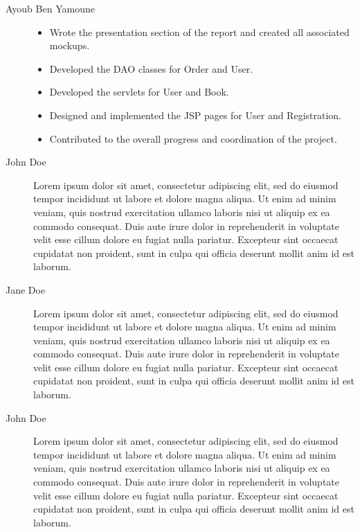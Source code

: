 \begin{description}
	\item[Ayoub Ben Yamoune] 	    
	\begin{itemize}
		\item Wrote the presentation section of the report and created all associated mockups.
		\item Developed the DAO classes for Order and User.
		\item Developed the servlets for User and Book.
		\item Designed and implemented the JSP pages for User and Registration.
		\item Contributed to the overall progress and coordination of the project.
	\end{itemize}


	\item[John Doe] Lorem ipsum dolor sit amet, consectetur adipiscing elit, sed do eiusmod tempor incididunt ut labore et dolore magna aliqua. Ut enim ad minim veniam, quis nostrud exercitation ullamco laboris nisi ut aliquip ex ea commodo consequat. Duis aute irure dolor in reprehenderit in voluptate velit esse cillum dolore eu fugiat nulla pariatur. Excepteur sint occaecat cupidatat non proident, sunt in culpa qui officia deserunt mollit anim id est laborum.
	\item[Jane Doe] Lorem ipsum dolor sit amet, consectetur adipiscing elit, sed do eiusmod tempor incididunt ut labore et dolore magna aliqua. Ut enim ad minim veniam, quis nostrud exercitation ullamco laboris nisi ut aliquip ex ea commodo consequat. Duis aute irure dolor in reprehenderit in voluptate velit esse cillum dolore eu fugiat nulla pariatur. Excepteur sint occaecat cupidatat non proident, sunt in culpa qui officia deserunt mollit anim id est laborum.
	\item[John Doe] Lorem ipsum dolor sit amet, consectetur adipiscing elit, sed do eiusmod tempor incididunt ut labore et dolore magna aliqua. Ut enim ad minim veniam, quis nostrud exercitation ullamco laboris nisi ut aliquip ex ea commodo consequat. Duis aute irure dolor in reprehenderit in voluptate velit esse cillum dolore eu fugiat nulla pariatur. Excepteur sint occaecat cupidatat non proident, sunt in culpa qui officia deserunt mollit anim id est laborum.

\end{description}
